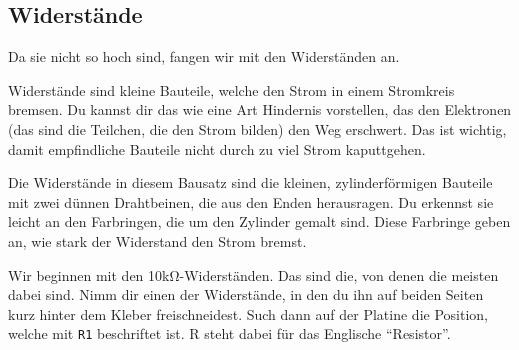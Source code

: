 \documentclass[10pt]{article}
\begin{document}
	\subsection{Widerstände}
	\begin{minipage}{0.975\textwidth}
		Da sie nicht so hoch sind, fangen wir mit den Widerständen an.
		
		Widerstände sind kleine Bauteile, welche den Strom in einem Stromkreis bremsen. Du kannst dir das wie eine Art Hindernis vorstellen, das den Elektronen (das sind die Teilchen, die den Strom bilden) den Weg erschwert. Das ist wichtig, damit empfindliche Bauteile nicht durch zu viel Strom kaputtgehen.
		
		Die Widerstände in diesem Bausatz sind die kleinen, zylinderförmigen Bauteile mit zwei dünnen Drahtbeinen, die aus den Enden herausragen. Du erkennst sie leicht an den Farbringen, die um den Zylinder gemalt sind. Diese Farbringe geben an, wie stark der Widerstand den Strom bremst.
		
		Wir beginnen mit den 10kΩ-Widerständen. Das sind die, von denen die meisten dabei sind. Nimm dir einen der Widerstände, in den du ihn auf beiden Seiten kurz hinter dem Kleber freischneidest. Such dann auf der Platine die Position, welche mit \verb*|R1| beschriftet ist. R steht dabei für das Englische \enquote{Resistor}.
	\end{minipage}
\end{document}
